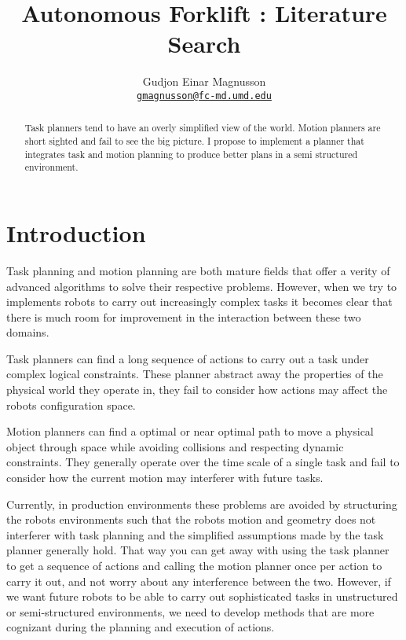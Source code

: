 \documentclass[letterpaper, 10 pt, conference]{ieeeconf}  %
\title{
Autonomous Forklift : Literature Search
}
\author{
Gudjon Einar Magnusson
\\ \href{mailto:gmagnusson@fc-md.umd.edu}{\tt\small gmagnusson@fc-md.umd.edu}
}
\begin{document}
\maketitle
\thispagestyle{empty}
\pagestyle{empty}


\begin{abstract}

Task planners tend to have an overly simplified view of the world. Motion planners are short sighted and fail to see the big picture. I propose to implement a planner that integrates task and motion planning to produce better plans in a semi structured environment. 

\end{abstract}


\section{Introduction}

Task planning and motion planning are both mature fields that offer a verity of advanced algorithms to solve their respective problems. However, when we try to implements robots to carry out increasingly complex tasks it becomes clear that there is much room for improvement in the interaction between these two domains. 

Task planners can find a long sequence of actions to carry out a task under complex logical constraints. These planner abstract away the properties of the physical world they operate in, they fail to consider how actions may affect the robots configuration space.

Motion planners can find a optimal or near optimal path to move a physical object through space while avoiding collisions and respecting dynamic constraints. They generally operate over the time scale of a single task and fail to consider how the current motion may interferer with future tasks.

Currently, in production environments these problems are avoided by structuring the robots environments such that the robots motion and geometry does not interferer with task planning and the simplified assumptions made by the task planner generally hold. That way you can get away with using the task planner to get a sequence of actions and calling the motion planner once per action to carry it out, and not worry about any interference between the two. However, if we want future robots to be able to carry out sophisticated tasks in unstructured or semi-structured environments, we need to develop methods that are more cognizant during the planning and execution of actions.
\end{document}

